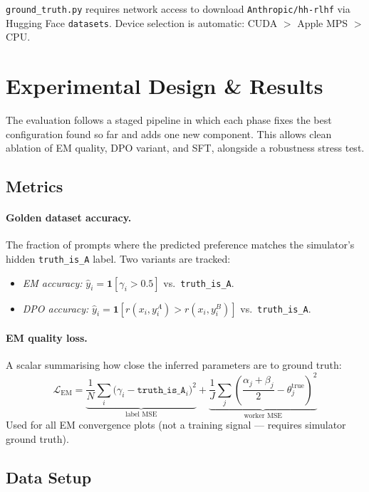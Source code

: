 \documentclass[11pt, a4paper]{article}
\begin{document}
\texttt{ground\_truth.py} requires network access to download \texttt{Anthropic/hh-rlhf}
via Hugging Face \texttt{datasets}. Device selection is automatic: CUDA $>$ Apple MPS $>$
CPU.

\newpage

\section{Experimental Design \& Results}

The evaluation follows a staged pipeline in which each phase fixes the best configuration
found so far and adds one new component. This allows clean ablation of EM quality, DPO
variant, and SFT, alongside a robustness stress test.

\subsection{Metrics}

\paragraph{Golden dataset accuracy.}
The fraction of prompts where the predicted preference matches the simulator's hidden
\texttt{truth\_is\_A} label. Two variants are tracked:
\begin{itemize}[noitemsep]
  \item \textit{EM accuracy:} $\hat{y}_i = \mathbf{1}[\gamma_i > 0.5]$ vs.\ \texttt{truth\_is\_A}.
  \item \textit{DPO accuracy:} $\hat{y}_i = \mathbf{1}[r(x_i,y_i^A) > r(x_i,y_i^B)]$ vs.\ \texttt{truth\_is\_A}.
\end{itemize}

\paragraph{EM quality loss.}
A scalar summarising how close the inferred parameters are to ground truth:
\[
  \mathcal{L}_\text{EM} =
    \underbrace{\frac{1}{N}\sum_i \bigl(\gamma_i - \texttt{truth\_is\_A}_i\bigr)^2}_{\text{label MSE}}
  + \underbrace{\frac{1}{J}\sum_j \left(\frac{\alpha_j+\beta_j}{2} - \theta_j^\text{true}\right)^2}_{\text{worker MSE}}
\]
Used for all EM convergence plots (not a training signal --- requires simulator ground truth).

\subsection{Data Setup}
\end{document}
